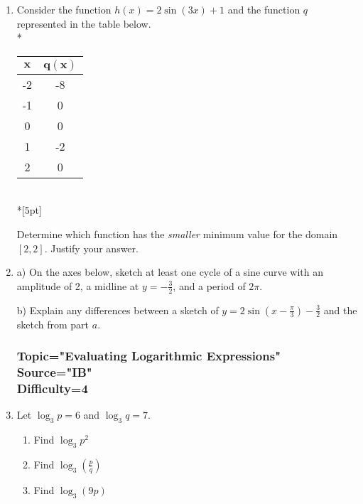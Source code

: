 \documentclass[12pt, oneside]{article}
\begin{document}
\begin{enumerate}
\item Consider the function $h(x) = 2\sin(3x) + 1$ and the function $q$ represented in the table below.\\*
\begin{center}
\begin{tabular}{|c|c|}
    \hline 
    $\boldsymbol{x}$ & $\boldsymbol{q(x)}$\\ 
    \hline 
    -2 & -8 \\ 
    \hline 
    -1 & 0 \\ 
    \hline 
    0 & 0 \\ 
    \hline 
    1 & -2 \\ 
    \hline 
    2 & 0 \\ 
    \hline 
\end{tabular}\\*[5pt]
\end{center}
Determine which function has the \emph{smaller} minimum value for the domain $[ 2,2]$. Justify your answer. %

\item a) On the axes below, sketch at least one cycle of a sine curve with an amplitude of 2, a midline at $\displaystyle y = -\frac{3}{2}$, and a period of $2\pi$. 
\begin{center}
\end{center}
b) Explain any differences between a sketch of $\displaystyle y = 2 \sin \left( x- \frac{\pi}{3} \right) -\frac{3}{2}$ and the sketch from part $a$. %

\subsubsection*{Topic="Evaluating Logarithmic Expressions"\\
Source="IB"\\
Difficulty=4}


\item Let $\log_3 p = 6$ and $\log_3 q = 7$.
\begin{enumerate}
    \item Find $\log_3 {p^2}$
    \item Find $\displaystyle \log_3 {\left( \frac{p}{q} \right) }$
    \item Find $\log_3 {(9p)}$
\end{enumerate}


\end{enumerate}
\end{document}
